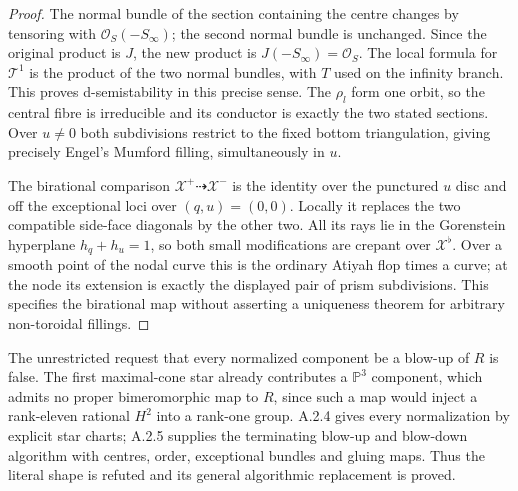 \begin{proof}
The normal bundle of the section containing the centre changes
by tensoring with $\mathcal O_S(-S_\infty)$; the second normal
bundle is unchanged. Since the original product is $J$, the
new product is $J(-S_\infty)=\mathcal O_S$. The local
formula for $\mathcal T^1$ is the product of the two normal
bundles, with $T$ used on the infinity branch. This proves
d-semistability in this precise sense. The $\rho_l$ form one
orbit, so the central fibre is irreducible and its conductor is
exactly the two stated sections. Over $u\ne0$ both subdivisions
restrict to the fixed bottom triangulation, giving precisely
Engel's Mumford filling, simultaneously in $u$.

The birational comparison $\mathcal X^+\dashrightarrow
\mathcal X^-$ is the identity over the punctured $u$ disc and
off the exceptional loci over $(q,u)=(0,0)$. Locally it replaces
the two compatible side-face diagonals by the other two.
All its rays lie in the Gorenstein hyperplane $h_q+h_u=1$,
so both small modifications are crepant over
$\mathcal X^\flat$. Over a smooth point of the nodal curve
this is the ordinary Atiyah flop times a curve; at the node its
extension is exactly the displayed pair of prism subdivisions.
This specifies the birational map without asserting a uniqueness
theorem for arbitrary non-toroidal fillings.
\end{proof}

\begin{remark}\label{push:src:A.2.3}\label{push:A23}
The unrestricted request that every normalized component
be a blow-up of $R$ is false. The first maximal-cone
star already contributes a $\mathbb P^3$ component,
which admits no proper bimeromorphic map to $R$, since
such a map would inject a rank-eleven rational $H^2$
into a rank-one group. A.2.4 gives every normalization
by explicit star charts; A.2.5 supplies the terminating
blow-up and blow-down algorithm with centres, order,
exceptional bundles and gluing maps. Thus the literal
shape is refuted and its general algorithmic
replacement is proved.
\end{remark}

